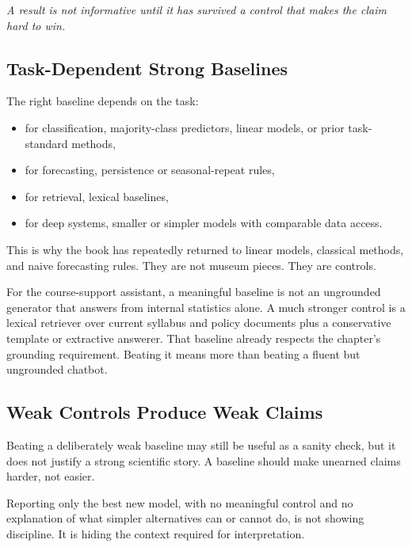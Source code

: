 \begin{center}
\emph{A result is not informative until it has survived a control that makes the claim hard to win.}
\end{center}

\subsection{Task-Dependent Strong Baselines}

The right baseline depends on the task:
\begin{itemize}[leftmargin=*]
\item for classification, majority-class predictors, linear models, or prior task-standard methods,
\item for forecasting, persistence or seasonal-repeat rules,
\item for retrieval, lexical baselines,
\item for deep systems, smaller or simpler models with comparable data access.
\end{itemize}

This is why the book has repeatedly returned to linear models, classical methods, and naive forecasting rules. They are not museum pieces. They are controls.

\begin{example}
For the course-support assistant, a meaningful baseline is not an ungrounded generator that answers from internal statistics alone. A much stronger control is a lexical retriever over current syllabus and policy documents plus a conservative template or extractive answerer. That baseline already respects the chapter's grounding requirement. Beating it means more than beating a fluent but ungrounded chatbot.
\end{example}

\subsection{Weak Controls Produce Weak Claims}

Beating a deliberately weak baseline may still be useful as a sanity check, but it does not justify a strong scientific story. A baseline should make unearned claims harder, not easier.

\begin{failurebox}
Reporting only the best new model, with no meaningful control and no explanation of what simpler alternatives can or cannot do, is not showing discipline. It is hiding the context required for interpretation.
\end{failurebox}

